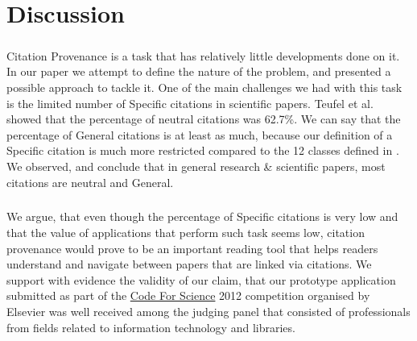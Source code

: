 \chapter{Discussion}
\label{discussion}
\paragraph{}
Citation Provenance is a task that has relatively little developments done on it. In our paper we attempt to define the nature of the problem, and presented a possible approach to tackle it. One of the main challenges we had with this task is the limited number of Specific citations in scientific papers. Teufel et al. showed that the percentage of neutral citations was 62.7\%. We can say that the percentage of General citations is at least as much, because our definition of a Specific citation is much more restricted compared to the 12 classes defined in \cite{teufel2009annotation}. We observed, and conclude that in general research \& scientific papers, most citations are neutral and General.

\paragraph{}
We argue, that even though the percentage of Specific citations is very low and that the value of applications that perform such task seems low, citation provenance would prove to be an important reading tool that helps readers understand and navigate between papers that are linked via citations. We support with evidence the validity of our claim, that our prototype application submitted as part of the \url{Code For Science} 2012 competition organised by Elsevier was well received among the judging panel that consisted of professionals from fields related to information technology and libraries.